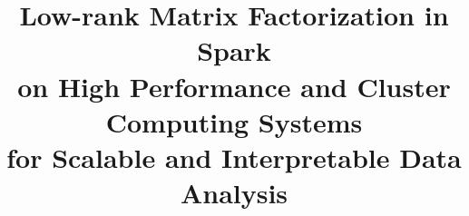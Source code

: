 \documentclass{acm_proc_article-sp}
\begin{document}
\title{Low-rank Matrix Factorization in Spark\\ on High Performance and Cluster Computing Systems\\ for Scalable and Interpretable Data Analysis}

%
%   
%   
%   
%   
%
\end{document}
